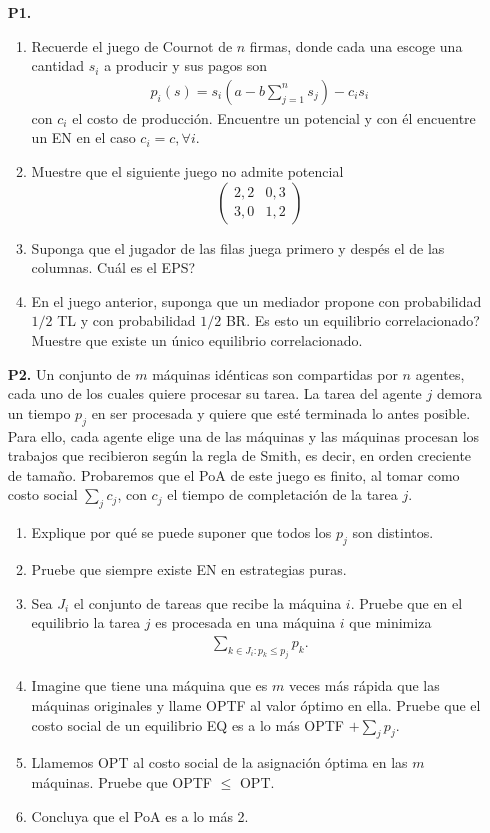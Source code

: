 \documentclass[11pt, spanish]{article}
\theoremstyle{plain}
\begin{document}
\begin{itemize}
\item[\textbf{P1.}] 
	\begin{enumerate}
		\item Recuerde el juego de Cournot de $n$ firmas, donde cada una
			escoge una cantidad $s_i$ a producir y sus pagos son
			\begin{align*}
				p_i(s)= s_i \left( a- b\sum_{j=1}^n s_j \right) -c_i s_i
			\end{align*}
			con $c_i$ el costo de producción. Encuentre un potencial y con \'el 
			encuentre un EN en el caso $c_i=c, \forall i$.
		\item Muestre que el siguiente juego no admite potencial
			\[
				\left( \begin{matrix} 2,2 & 0,3 \\ 3,0 & 1,2 \end{matrix}\right)
			\]
		\item Suponga que el jugador de las filas juega primero y desp\'es el de las columnas.
			Cuál es el EPS?
		\item En el juego anterior, suponga que un mediador propone con probabilidad
			$1/2$ TL y con probabilidad $1/2$ BR. Es esto un equilibrio
			correlacionado? Muestre que existe un único equilibrio correlacionado.

	\end{enumerate}

\item[\textbf{P2.}] Un conjunto de $m$ máquinas id\'enticas son compartidas por $n$
	agentes, cada uno de los cuales quiere procesar su tarea. La tarea del
	agente $j$ demora un tiempo $p_j$ en ser procesada y quiere que est\'e
	terminada lo antes posible. Para ello, cada agente elige una de las máquinas
	y las máquinas procesan los trabajos que recibieron según la regla de Smith,
	es decir, en orden creciente de tamaño. Probaremos que el PoA de este juego
	es finito, al tomar como costo social $\sum_j c_j$, con $c_j$ el tiempo
	de completación de la tarea $j$.
	\begin{enumerate}
		\item Explique por qu\'e se puede suponer que todos los $p_j$ son
			distintos.
		\item Pruebe que siempre existe EN en estrategias puras.
		\item Sea $J_i$ el conjunto de tareas que recibe la máquina $i$.
			Pruebe que en el equilibrio la tarea $j$ es procesada
			en una máquina $i$ que minimiza 
			\begin{align*}
				\sum_{k\in J_i: p_k\leq p_j} p_k.
			\end{align*}
		\item Imagine que tiene una máquina que es $m$ veces más rápida
			que las máquinas originales y llame OPTF al valor 
			óptimo en ella. Pruebe que el costo social de un equilibrio
			EQ es a lo más OPTF $+ \sum_j p_j$.
		\item Llamemos OPT al costo social de la asignación óptima en 
			las $m$ máquinas. Pruebe que OPTF $\leq$ OPT.
		\item Concluya que el PoA es a lo más 2.
	\end{enumerate}


	

\end{itemize}
\end{document}

